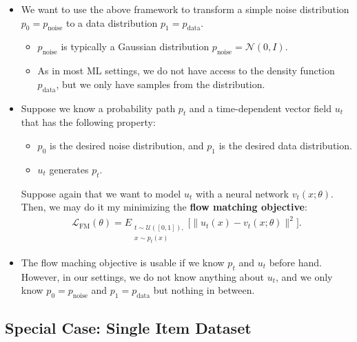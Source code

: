 \documentclass[10pt]{article}
\newcommand{\mrm}[1]{\mathrm{#1}}
\newcommand{\mcal}[1]{\mathcal{#1}}
\begin{document}
\begin{itemize}
  \item We want to use the above framework to transform a simple noise distribution $p_0 = p_{\mrm{noise}}$ to a data distribution $p_1 = p_{\mrm{data}}$.
  \begin{itemize}
    \item $p_{\mrm{noise}}$ is typically a Gaussian distribution $p_{\mrm{noise}} = \mcal{N}(0,I)$.
    \item As in most ML settings, we do not have access to the density function $p_{\mrm{data}}$, but we only have samples from the distribution.
  \end{itemize}

  \item Suppose we know a probability path $p_t$ and a time-dependent vector field $u_t$ that has the following property:
  \begin{itemize}
    \item $p_0$ is the desired noise distribution, and $p_1$ is the desired data distribution.
    \item $u_t$ generates $p_t$.
  \end{itemize}
  Suppose again that we want to model $u_t$ with a neural network $v_t(x; \theta)$. Then, we may do it my minimizing the {\bf flow matching objective}:
  \begin{align}
    \mcal{L}_{\mrm{FM}}(\theta) = E_{\substack{t \sim \mcal{U}([0,1]),\\ x \sim p_t(x)}} \big[ \| u_t(x) - v_t(x; \theta) \|^2 \big]. \label{eqn:flow-matching-loss}
  \end{align}

  \item The flow maching objective is usable if we know $p_t$ and $u_t$ before hand. However, in our settings, we do not know anything about $u_t$, and we only know $p_0 = p_{\mrm{noise}}$ and $p_1 = p_{\mrm{data}}$ but nothing in between.
\end{itemize}

\subsection{Special Case: Single Item Dataset}
\end{document}
